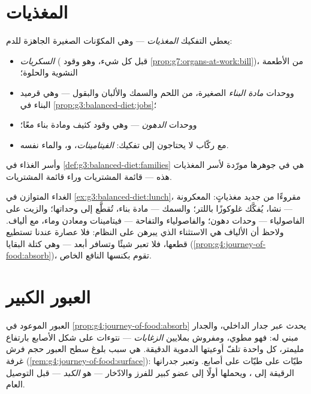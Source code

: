 \section{المغذيات}

\begin{definition}\label{def:g7:digestion-and-nutrients:families}
يعطي التفكيك \emph{المغذيات} --- وهي المكوّنات
الصغيرة الجاهزة للدم:
\begin{itemize}
  \item \emph{السكريات} ( قبل كل شيء، وهو وقود
        \cref{prop:g7:organs-at-work:bill})، من الأطعمة النشوية
        والحلوة؛
  \item ووحدات \emph{مادة البناء} الصغيرة، من اللحم والسمك
         والألبان والبقول --- وهي قرميد البناء في
        \cref{prop:g3:balanced-diet:jobs}؛
  \item ووحدات \emph{الدهون} --- وهي وقود كثيف ومادة بناء معًا؛
  \item مع ركّاب لا يحتاجون إلى تفكيك:
        \emph{الفيتامينات}، و\emph{}، والماء
        نفسه.
\end{itemize}
وأسر الغذاء في \cref{def:g3:balanced-diet:families} هي في جوهرها
مورّدة لأسر المغذيات هذه --- قائمة المشتريات وراء قائمة المشتريات.
\end{definition}

\begin{example}\label{ex:g7:digestion-and-nutrients:lunch}
الغداء المتوازن في \cref{ex:g3:balanced-diet:lunch}، مقروءًا من
جديد مغذياتٍ: المعكرونة --- نشا، يُفكَّك غلوكوزًا باللتر؛ والسمك ---
مادة بناء، تُقطَّع إلى وحداتها؛ والزيت على الفاصولياء --- وحدات
دهون؛ والفاصولياء والتفاحة --- فيتامينات ومعادن وماء، مع ألياف.
ولاحظ أن الألياف هي الاستثناء الذي يبرهن على النظام: فلا عصارة
عندنا تستطيع قطعها، فلا تعبر شيئًا وتسافر أبعد --- وهي كتلة
البقايا (\cref{prop:g4:journey-of-food:absorb})، تقوم بكنسها
النافع الخاص.
\end{example}

\section{العبور الكبير}

\begin{proposition}\label{prop:g7:digestion-and-nutrients:absorption}
العبور الموعود في
\cref{prop:g4:journey-of-food:absorb} يحدث عبر جدار 
الداخلي، والجدار مبني له: فهو مطوي، ومفروش بملايين
\emph{الزغابات} --- نتوءات على شكل الأصابع بارتفاع
مليمتر، كل واحدة تلفّ أوعيتها الدموية الدقيقة.  هي سبب
بلوغ سطح العبور حجم فرش غرفة (\cref{rem:g4:journey-of-food:surface}):
طيّات على طيّات على أصابع. وتعبر  جدرانها الرقيقة إلى ،
ويحملها  أولًا إلى عضو كبير للفرز والادّخار --- هو
\emph{الكبد} --- قبل التوصيل العام.
\end{proposition}
\admitted

